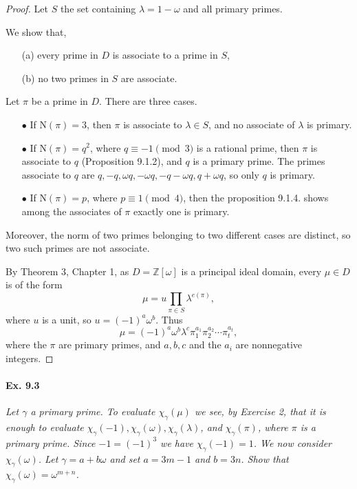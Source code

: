 \documentclass[11pt,a4paper]{article}
\newcommand{\Z}{\mathbb{Z}}
\newcommand{\n}{\mathrm{N}}
\begin{document}
\begin{proof}

Let $S$ the set containing $\lambda = 1 - \omega$ and all primary primes. 

We show that,
\begin{enumerate}
\item[(a)] every prime in $D$ is associate to a prime in $S$,
\item[(b)] no two primes in $S$ are associate.
\end{enumerate}

 Let $\pi$ be a prime in $D$. There are three cases.

  \begin{enumerate}
  \item[$\bullet$] If $\n(\pi) = 3$, then $\pi$ is associate to $\lambda \in S$, and no associate of $\lambda$ is primary.
  \item[$\bullet$] If $\n(\pi) = q^2$, where $q \equiv -1 \pmod 3$ is a rational prime, then $\pi$ is associate to $q$ (Proposition 9.1.2), and $q$ is a primary prime.
  	The primes associate to $q$ are $q, -q, \omega q, -\omega q, -q - \omega q, q + \omega q$, so only $q$ is primary.
  \item[$\bullet$] If $\n(\pi) = p$, where $p \equiv 1 \pmod 4$, then the proposition 9.1.4. shows among the associates of $\pi$ exactly one is primary.
  \end{enumerate}
   Moreover, the norm of two primes belonging to two different cases are distinct, so two such primes are not associate.

By Theorem 3, Chapter 1, as $D = \Z[\omega]$ is a principal ideal domain,  every $\mu \in D$ is of the form
$$\mu = u \prod_{\pi \in S} \lambda^{e(\pi)},$$
where $u$ is a unit, so $u = (-1)^a\omega^b$. Thus
$$\mu = (-1)^a \omega^b \lambda^c\pi_1^{a_1}\pi_2^{a_2}\cdots\pi_t^{a_t},$$ where the $\pi$ are primary primes, and $a,b,c$ and the $a_i$ are nonnegative integers.
\end{proof}

\paragraph{Ex. 9.3}

{\it Let $\gamma$ a primary prime. To evaluate $\chi_\gamma(\mu)$ we see, by Exercise 2, that it is enough to evaluate $\chi_\gamma(-1), \chi_\gamma(\omega), \chi_\gamma(\lambda)$, and $\chi_\gamma(\pi)$, where $\pi$ is a primary prime. Since $-1 =(-1)^3$ we have $\chi_\gamma(-1) = 1$. We now consider $\chi_\gamma(\omega)$. Let $\gamma = a+b \omega$ and set $a = 3m -1$ and $b=3n$. Show that $\chi_\gamma(\omega) = \omega^{m+n}$.
}
\end{document}
